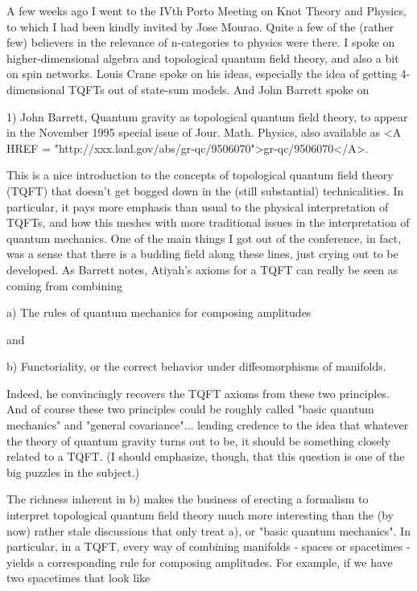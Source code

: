 

A few weeks ago I went to the IVth Porto Meeting on Knot Theory and
Physics, to which I had been kindly invited by Jose Mourao.  Quite 
a few of the (rather few) believers in the relevance of n-categories to physics
were there.  I spoke on higher-dimensional algebra and topological quantum
field theory, and also a bit on spin networks.  Louis Crane spoke on his ideas, 
especially the idea of getting 4-dimensional TQFTs out of state-sum
models.  And John Barrett spoke on 

1)  John Barrett, Quantum gravity as topological quantum field theory, to 
appear in the November 1995 special issue of Jour. Math. Physics, also 
available as <A HREF = "http://xxx.lanl.gov/abs/gr-qc/9506070">gr-qc/9506070</A>.

This is a nice introduction to the concepts of topological quantum field
theory (TQFT) that doesn't get bogged down in the (still substantial) 
technicalities.  In particular, it pays more emphasis than usual to the physical
interpretation of TQFTs, and how this meshes with more traditional issues
in the interpretation of quantum mechanics.  One of the main things
I got out of the conference, in fact, was a sense that there is a budding field
along these lines, just crying out to be developed.  As Barrett notes, Atiyah's
axioms for a TQFT can really be seen as coming from combining 

a) The rules of quantum mechanics for composing amplitudes

and 

b) Functoriality, or the correct behavior under diffeomorphisms of manifolds.

Indeed, he convincingly recovers the TQFT axioms from these two principles.
And of course these two principles could be roughly called "basic quantum
mechanics" and "general covariance"... lending credence to the idea that 
whatever the theory of quantum gravity turns out to be, it should be 
something closely related to a TQFT.  (I should emphasize, though, 
that this question is one of the big puzzles in the subject.) 

The richness inherent in b) makes the business of erecting a formalism
to interpret topological quantum field theory much more interesting than the
(by now) rather stale discussions that only treat a), or "basic quantum 
mechanics".  In particular, in a TQFT, every way of combining 
manifolds - spaces or spacetimes - yields a corresponding rule for 
composing amplitudes.  For example, if we have two spacetimes that look 
like



